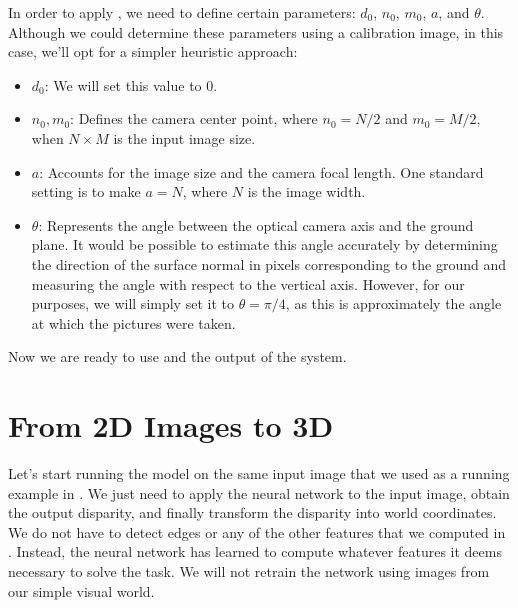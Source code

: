 In order to apply \eqn{\ref{eq:recoverworldcoord}}, we need to define certain parameters:
$d_0$, $n_0$, $m_0$, $a$, and $\theta$.
Although we could determine these parameters using a calibration image, in this case, we'll opt for a simpler heuristic approach:
\begin{itemize}
    \item $d_0$: We will set this value to 0. 
    \item $n_0,m_0$: Defines the camera center point, where $n_0=N/2$ and $m_0=M/2$, when $N \times M$ is the input image size.
    \item $a$: Accounts for the image size and the camera focal length. One standard setting is to make $a = N$, where $N$ is the image width. 
    \item $\theta$: Represents the angle between the optical camera axis and the ground plane. 
    It would be possible to estimate this angle accurately by determining the direction of the surface normal in pixels corresponding to the ground and measuring the angle with respect to the vertical axis. However, for our purposes, we will simply set it to  $\theta = \pi / 4$, as this is approximately the angle at which the pictures were taken.
    
\end{itemize}

Now we are ready to use \eqn{\ref{eq:recoverworldcoord}} and the output of the system.

\section{From 2D Images to 3D}


Let's start running the model on the same input image that we used as a running example in \chap{\ref{chapter:simplesystem}}. We just need to apply the neural network to the input image, obtain the output disparity, and finally transform the disparity into world coordinates. We do not have to detect edges or any of the other features that we computed in \chap{\ref{chapter:simplesystem}}. Instead, the neural network has learned to compute whatever features it deems necessary to solve the task. We will not retrain the network using images from our simple visual world. 


